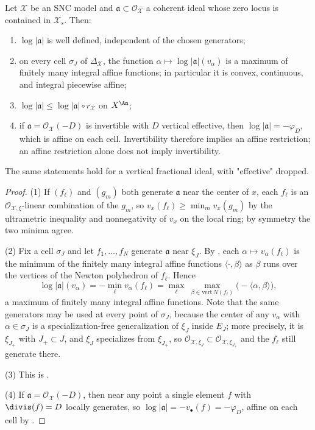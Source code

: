 \begin{lemma}
\label{lem:vertical-ideal-convex}
Let $\mathcal X$ be an SNC model and $\mathfrak a\subset
\mathcal O_{\mathcal X}$ a coherent ideal whose zero locus is contained in
$\mathcal X_s$. Then:
\begin{enumerate}
\item $\log|\mathfrak a|$ is well defined, independent of the chosen
  generators;
\item on every cell $\sigma_J$ of $\Delta_{\mathcal X}$, the function
  $\alpha\mapsto\log|\mathfrak a|(v_\alpha)$ is a maximum of finitely many
  integral affine functions; in particular it is convex, continuous, and
  integral piecewise affine;
\item $\log|\mathfrak a|\le\log|\mathfrak a|\circ r_{\mathcal X}$ on
  $X^{\An}$;
\item if $\mathfrak a=\mathcal O_{\mathcal X}(-D)$ is invertible with
  $D$ vertical effective, then $\log|\mathfrak a|=-\varphi_D$, which is
  affine on each cell. Invertibility therefore implies an affine
  restriction; an affine restriction alone does not imply invertibility.
\end{enumerate}
The same statements hold for a vertical fractional ideal, with "effective"
dropped.
\end{lemma}

\begin{proof}
(1) If $(f_\ell)$ and $(g_m)$ both generate $\mathfrak a$ near the
center of $x$, each $f_\ell$ is an $\mathcal O_{\mathcal X,\xi}$-linear
combination of the $g_m$, so $v_x(f_\ell)\ge\min_mv_x(g_m)$ by the
ultrametric inequality and nonnegativity of $v_x$ on the local ring; by
symmetry the two minima agree.

(2) Fix a cell $\sigma_J$ and let $f_1,\ldots,f_N$ generate
$\mathfrak a$ near $\xi_J$. By , each
$\alpha\mapsto v_\alpha(f_\ell)$ is the minimum of the finitely many
integral affine functions $\langle\cdot,\beta\rangle$ as $\beta$ runs
over the vertices of the Newton polyhedron of $f_\ell$. Hence
\[
 \log|\mathfrak a|(v_\alpha)
 =-\min_\ell v_\alpha(f_\ell)
 =\max_\ell\ \max_{\beta\in\mathrm{vert}\,N(f_\ell)}
   \bigl(-\langle\alpha,\beta\rangle\bigr),
\]
a maximum of finitely many integral affine functions. Note that the same
generators may be used at every point of $\sigma_J$, because the center of
any $v_\alpha$ with $\alpha\in\sigma_J$ is a specialization-free
generalization of $\xi_J$ inside $E_J$; more precisely, it is
$\xi_{J_+}$ with $J_+\subset J$, and $\xi_J$ specializes from
$\xi_{J_+}$, so $\mathcal O_{\mathcal X,\xi_J}\subset
\mathcal O_{\mathcal X,\xi_{J_+}}$ and the $f_\ell$ still generate there.

(3) This is .

(4) If $\mathfrak a=\mathcal O_{\mathcal X}(-D)$, then near any point a
single element $f$ with $\divis(f)=D$ locally generates, so
$\log|\mathfrak a|=-v_\bullet(f)=-\varphi_D$, affine on each cell by
.
\end{proof}

